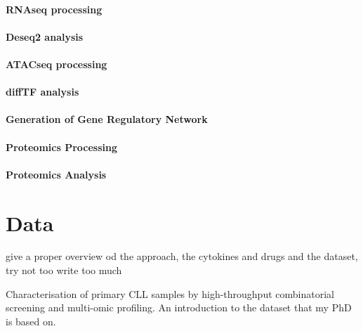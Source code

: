 \documentclass[11pt, a4paper, twosided]{book}
\begin{document}
\hypertarget{rnaseq-processing}{%
\subsubsection{RNAseq processing}\label{rnaseq-processing}}

\hypertarget{deseq2-analysis}{%
\subsubsection{Deseq2 analysis}\label{deseq2-analysis}}

\hypertarget{atacseq-processing-1}{%
\subsubsection{ATACseq processing}\label{atacseq-processing-1}}

\hypertarget{difftf-analysis}{%
\subsubsection{diffTF analysis}\label{difftf-analysis}}

\hypertarget{generation-of-gene-regulatory-network}{%
\subsubsection{Generation of Gene Regulatory Network}\label{generation-of-gene-regulatory-network}}

\hypertarget{proteomics-processing}{%
\subsubsection{Proteomics Processing}\label{proteomics-processing}}

\hypertarget{proteomics-analysis}{%
\subsubsection{Proteomics Analysis}\label{proteomics-analysis}}

\hypertarget{data}{%
\chapter{Data}\label{data}}

give a proper overview od the approach, the cytokines and drugs and the dataset, try not too write too much

Characterisation of primary CLL samples by high-throughput combinatorial screening and multi-omic profiling. An introduction to the dataset that my PhD is based on.
\end{document}

